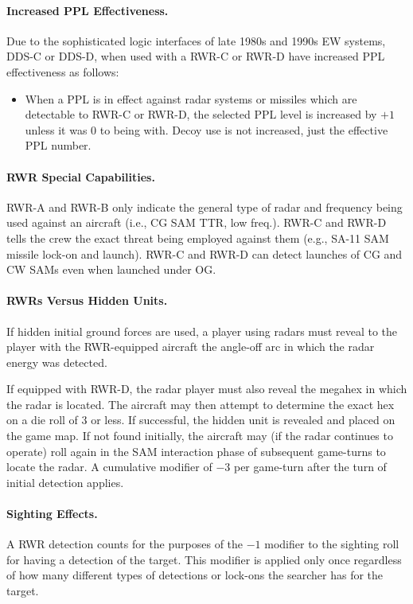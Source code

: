 \begin{advancedrules}
\paragraph{Increased PPL Effectiveness.} Due to the sophisticated logic interfaces of late 1980s and 1990s EW systems, DDS-C or DDS-D, when used with a RWR-C or RWR-D have increased PPL effectiveness as follows:

\begin{itemize}
    \item When a PPL is in effect against radar systems or missiles which are detectable to RWR-C or RWR-D, the selected PPL level is increased by $+1$ unless it was 0 to being with. Decoy use is not increased, just the effective PPL number.
\end{itemize}

\paragraph{RWR Special Capabilities.} RWR-A and RWR-B only indicate the general type of radar and frequency being used against an aircraft (i.e., CG SAM TTR, low freq.). RWR-C and RWR-D tells the crew the exact threat being employed against them (e.g., SA-11 SAM missile lock-on and launch). RWR-C and RWR-D can detect launches of CG and CW SAMs even when launched under OG.

\paragraph{RWRs Versus Hidden Units.} If hidden initial ground forces are used, a player using radars must reveal to the player with the RWR-equipped aircraft the angle-off arc in which the radar energy was detected.

If equipped with RWR-D, the radar player must also reveal the megahex in which the radar is located. The aircraft may then attempt to determine the exact hex on a die roll of 3 or less. If successful, the hidden unit is revealed and placed on the game map. If not found initially, the aircraft may (if the radar continues to operate) roll again in the SAM interaction phase of subsequent game-turns to locate the radar. A cumulative modifier of $-3$ per game-turn after the turn of initial detection applies.

\paragraph{Sighting Effects.} A RWR detection counts for the purposes of the $-1$ modifier to the sighting roll for having a detection of the target. This modifier is applied only once regardless of how many different types of detections or lock-ons the searcher has for the target.


\end{advancedrules}
